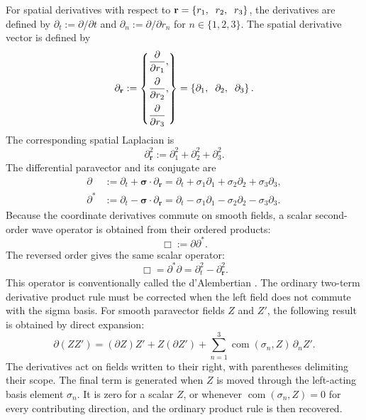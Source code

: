 \documentclass[10pt,letterpaper]{article}
\newcommand{\eqfunc}[1]{\operatorname{#1}}
\newcommand{\pv}[1]{#1}
\newcommand{\vct}[1]{\mathbf{#1}}
\newcommand{\sigv}{\vct{\pv{\bm{\sigma}}}}
\newcommand{\delop}{\partial}
\newcommand{\delr}{\delop_{\vct{r}}}
\newcommand{\gradv}{\delr}
\newcommand{\conj}[1]{#1^{*}}
\newcommand{\vthree}[3]{%
  \left\{#1,\mkern10mu #2,\mkern10mu #3\right\}%
}
\newcommand{\vthreeeq}[3]{%
  \left\{%
  \begin{aligned}
  & #1,\\[0.12em]
  & #2,\\[0.12em]
  & #3
  \end{aligned}%
  \right\}%
}
\newcommand{\com}[2]{\eqfunc{com}\!\left(#1,#2\right)}
\begin{document}
For spatial derivatives with respect to
\(\vct{r}=\vthree{r_1}{r_2}{r_3}\), the derivatives are defined by
\(\partial_t:=\partial/\partial t\) and
\(\partial_n:=\partial/\partial r_n\) for \(n\in\{1,2,3\}\). The spatial
derivative vector is defined by
\begin{equation}
\delr:=\vthreeeq
{\dfrac{\partial}{\partial r_1}}
{\dfrac{\partial}{\partial r_2}}
{\dfrac{\partial}{\partial r_3}}
=\vthree{\partial_1}{\partial_2}{\partial_3}.
\label{eq:gradient-notation}
\end{equation}
The corresponding spatial Laplacian is
\begin{equation}
\gradv^2:=\partial_1^2+\partial_2^2+\partial_3^2.
\label{eq:laplacian}
\end{equation}
The differential paravector and its conjugate are
\begin{align}
\pv{\partial}&:=\partial_t+\sigv\cdot\gradv
=\partial_t+\pv{\sigma}_1\partial_1+\pv{\sigma}_2\partial_2+\pv{\sigma}_3\partial_3,
\label{eq:partial-operator}\\
\conj{\pv{\partial}}&:=\partial_t-\sigv\cdot\gradv
=\partial_t-\pv{\sigma}_1\partial_1-\pv{\sigma}_2\partial_2-\pv{\sigma}_3\partial_3.
\label{eq:partial-conjugate}
\end{align}
Because the coordinate derivatives commute on smooth fields, a scalar
second-order wave operator is obtained from their ordered products:
\begin{equation}
\Box:=\pv{\partial}\conj{\pv{\partial}}.
\label{eq:dalembertian}
\end{equation}
The reversed order gives the same scalar operator:
\begin{equation}
\Box=\conj{\pv{\partial}}\pv{\partial}
=\partial_t^2-\gradv^2.
\label{eq:dalembertian-expansion}
\end{equation}
This operator is conventionally called the d'Alembertian
\cite{klein1926,gordon1926}. The ordinary two-term derivative product rule
must be corrected when the left field does not commute with the sigma basis.
For smooth paravector fields \(\pv{Z}\) and \(\pv{Z}'\), the following result
is obtained by direct expansion:
\begin{equation}
\pv{\partial}(\pv{Z}\pv{Z}')
=(\pv{\partial}\pv{Z})\pv{Z}'
+\pv{Z}(\pv{\partial}\pv{Z}')
+\sum_{n=1}^{3}\com{\pv{\sigma}_n}{\pv{Z}}\,\partial_n\pv{Z}'.
\label{eq:paravector-leibniz}
\end{equation}
The derivatives act on fields written to their right, with parentheses
delimiting their scope. The final term is generated when \(\pv{Z}\) is moved
through the left-acting basis element \(\pv{\sigma}_n\). It is zero for a
scalar \(\pv{Z}\), or
whenever \(\com{\pv{\sigma}_n}{\pv{Z}}=0\) for every contributing direction,
and the ordinary product rule is then recovered.

\end{document}
